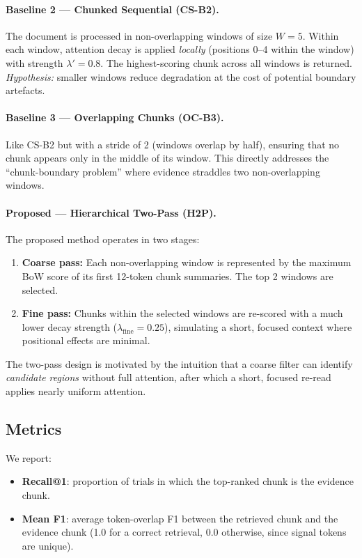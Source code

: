 \documentclass[sigconf,nonacm]{acmart}
\begin{document}
\paragraph{Baseline 2 — Chunked Sequential (CS-B2).}
The document is processed in non-overlapping windows of size $W = 5$.
Within each window, attention decay is applied \emph{locally} (positions 0–4
within the window) with strength $\lambda' = 0.8$.
The highest-scoring chunk across all windows is returned.
\emph{Hypothesis:} smaller windows reduce degradation at the cost of potential
boundary artefacts.

\paragraph{Baseline 3 — Overlapping Chunks (OC-B3).}
Like CS-B2 but with a stride of 2 (windows overlap by half), ensuring that no
chunk appears only in the middle of its window.
This directly addresses the ``chunk-boundary problem'' where evidence straddles
two non-overlapping windows.

\paragraph{Proposed — Hierarchical Two-Pass (H2P).}
The proposed method operates in two stages:

\begin{enumerate}
  \item \textbf{Coarse pass:} Each non-overlapping window is represented by the
    maximum BoW score of its first 12-token chunk summaries.
    The top 2 windows are selected.
  \item \textbf{Fine pass:} Chunks within the selected windows are re-scored
    with a much lower decay strength ($\lambda_\text{fine} = 0.25$), simulating
    a short, focused context where positional effects are minimal.
\end{enumerate}

The two-pass design is motivated by the intuition that a coarse filter can
identify \emph{candidate regions} without full attention, after which a short,
focused re-read applies nearly uniform attention.

\subsection{Metrics}

We report:
\begin{itemize}
  \item \textbf{Recall@1}: proportion of trials in which the top-ranked chunk is
    the evidence chunk.
  \item \textbf{Mean F1}: average token-overlap F1 between the retrieved chunk
    and the evidence chunk (1.0 for a correct retrieval, 0.0 otherwise, since
    signal tokens are unique).
\end{itemize}
\end{document}
